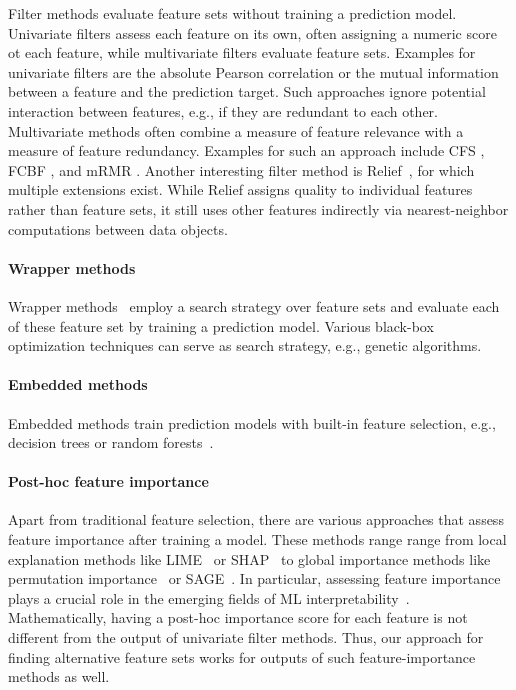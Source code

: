 \documentclass{article}
\theoremstyle{definition}
\begin{document}
Filter methods evaluate feature sets without training a prediction model.
Univariate filters assess each feature on its own, often assigning a numeric score ot each feature, while multivariate filters evaluate feature sets.
Examples for univariate filters are the absolute Pearson correlation or the mutual information between a feature and the prediction target.
Such approaches ignore potential interaction between features, e.g., if they are redundant to each other.
Multivariate methods often combine a measure of feature relevance with a measure of feature redundancy.
Examples for such an approach include CFS \cite{hall1999correlation}, FCBF \cite{yu2003feature}, and mRMR \cite{peng2005feature}.
Another interesting filter method is Relief~\cite{kira1992feature}, for which multiple extensions exist.
While Relief assigns quality to individual features rather than feature sets, it still uses other features indirectly via nearest-neighbor computations between data objects.

\paragraph{Wrapper methods}

Wrapper methods~\cite{kohavi1997wrappers} employ a search strategy over feature sets and evaluate each of these feature set by training a prediction model.
Various black-box optimization techniques can serve as search strategy, e.g., genetic algorithms.

\paragraph{Embedded methods}

Embedded methods train prediction models with built-in feature selection, e.g., decision trees or random forests~\cite{breiman2001random}.

\paragraph{Post-hoc feature importance}

Apart from traditional feature selection, there are various approaches that assess feature importance after training a model.
These methods range range from local explanation methods like LIME~\cite{ribeiro2016should} or SHAP~\cite{lundberg2017unified} to global importance methods like permutation importance~\cite{breiman2001random} or SAGE~\cite{covert2020understanding}.
In particular, assessing feature importance plays a crucial role in the emerging fields of ML interpretability~\cite{carvalho2019machine}.
Mathematically, having a post-hoc importance score for each feature is not different from the output of univariate filter methods.
Thus, our approach for finding alternative feature sets works for outputs of such feature-importance methods as well.
\end{document}
